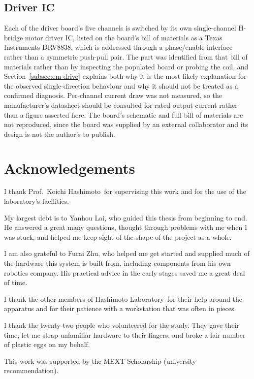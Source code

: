 \documentclass[12pt, a4paper, twoside, openright]{report}
\newcommand{\labname}{Hashimoto Laboratory}
\newcommand{\supervisorname}{Prof.\ Koichi Hashimoto}
\begin{document}
\section*{Driver IC}

Each of the driver board's five channels is switched by its own single-channel
H-bridge motor driver IC, listed on the board's bill of materials as a Texas
Instruments DRV8838, which is addressed through a phase/enable interface rather
than a symmetric push-pull pair. The part was identified from that bill of
materials rather than by inspecting the populated board or probing the coil,
and Section~\ref{subsec:em-drive} explains both why it is the most likely
explanation for the observed single-direction behaviour and why it should not
be treated as a confirmed diagnosis. Per-channel current draw was not measured, so
the manufacturer's datasheet should be consulted for rated output current
rather than a figure asserted here. The board's schematic and full bill of
materials are not reproduced, since the board was supplied by an external
collaborator and its design is not the author's to publish.

\cleardoublepage
\chapter*{Acknowledgements}

I thank \supervisorname\ for supervising this work and for the use of the
laboratory's facilities.

My largest debt is to Yanhou Lai, who guided this thesis from beginning to
end. He answered a great many questions, thought through problems with me when
I was stuck, and helped me keep sight of the shape of the project as a whole.

I am also grateful to Fucai Zhu, who helped me get started and supplied much of
the hardware this system is built from, including components from his own
robotics company. His practical advice in the early stages saved me a great
deal of time.

I thank the other members of \labname\ for their help around the apparatus and
for their patience with a workstation that was often in pieces.

I thank the twenty-two people who volunteered for the study. They gave their
time, let me strap unfamiliar hardware to their fingers, and broke a fair
number of plastic eggs on my behalf.

This work was supported by the MEXT Scholarship (university recommendation).
\end{document}
